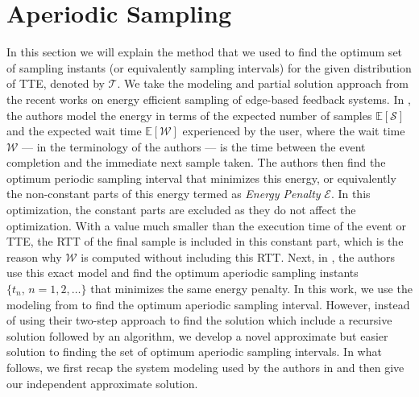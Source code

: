 \section{Aperiodic Sampling}

In this section we will explain the method that we used to find the optimum set of sampling instants (or equivalently sampling intervals) for the given distribution of TTE, denoted by $\mathcal{T}$.
We take the modeling and partial solution approach from the recent works on energy efficient sampling of edge-based feedback systems.
In \textcite{ICCperiodic1,TMCperiodic}, the authors model the energy in terms of the expected number of samples $\mathbb{E}[\mathcal{S}]$ and the expected wait time $\mathbb{E}[\mathcal{W}]$ experienced by the user, where the wait time $\mathcal{W}$ --- in the terminology of the authors --- is the time between the event completion and the immediate next sample taken.
The authors then find the optimum periodic sampling interval that minimizes this energy, or equivalently the non-constant parts of this energy termed as \textit{Energy Penalty} $\mathcal{E}$.
In this optimization, the constant parts are excluded as they do not affect the optimization.
With a value much smaller than the execution time of the event or TTE, the RTT of the final sample is included in this constant part, which is the reason why $\mathcal{W}$ is computed without including this RTT.
Next, in \textcite{secAperiodic}, the authors use this exact model and find the optimum aperiodic sampling instants $\{t_n,\,n=1,2,\dots\}$ that minimizes the same energy penalty.
In this work, we use the modeling from \textcite{secAperiodic} to find the optimum aperiodic sampling interval.
However, instead of using their two-step approach to find the solution which include a recursive solution followed by an algorithm, we develop a novel approximate but easier solution to finding the set of optimum aperiodic sampling intervals.
In what follows, we first recap the system modeling used by the authors in \textcite{secAperiodic} and then give our independent approximate solution. 


